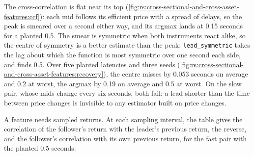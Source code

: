 The cross-correlation is flat near its top (\cref{fig:rs:cross-sectional-and-cross-asset-features:ccf}): each mid follows its
efficient price with a spread of delays, so the peak is smeared over a second either way, and its argmax lands at 0.15 seconds
for a planted 0.5. The smear is symmetric when both instruments react alike, so the centre of symmetry is a better estimate than
the peak: \texttt{lead\_symmetric} takes the lag about which the function is most symmetric over one second each side, and
finds 0.5. Over five planted latencies and three seeds (\cref{fig:rs:cross-sectional-and-cross-asset-features:recovery}), the
centre misses by 0.053 seconds on average and 0.2 at worst, the argmax by 0.19 on average and 0.5 at worst. On the slow pair,
whose mids change every six seconds, both fail: a lead shorter than the time between price changes is invisible to any estimator
built on price changes.

\begin{omfigure}

\label{fig:rs:cross-sectional-and-cross-asset-features:recovery}
\end{omfigure}

A feature needs sampled returns. At each sampling interval, the table gives the correlation of the follower's return with the
leader's previous return, the reverse, and the follower's correlation with its own previous return, for the fast pair with the
planted 0.5 seconds:

